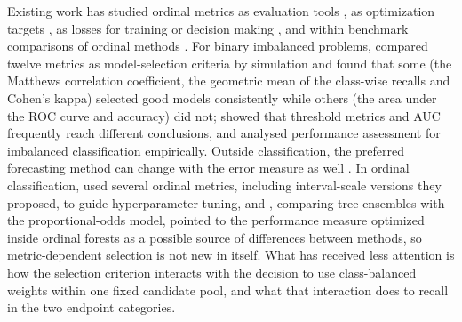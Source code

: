 \documentclass[pdflatex,sn-mathphys-ay]{sn-jnl}
\theoremstyle{thmstyleone}
\theoremstyle{thmstylethree}
\begin{document}
Existing work has studied ordinal metrics as evaluation tools \citep{Baccianella2009,BenDavid2008,Yilmaz2023,Binotto2025}, as optimization targets \citep{CruzRamirez2014}, as losses for training or decision making \citep{delaTorre2018,Delgado2026}, and within benchmark comparisons of ordinal methods \citep{Gutierrez2016,Buczak2025}. For binary imbalanced problems, \citet{delaCruzHuayanay2024} compared twelve metrics as model-selection criteria by simulation and found that some (the Matthews correlation coefficient, the geometric mean of the class-wise recalls and Cohen's kappa) selected good models consistently while others (the area under the ROC curve and accuracy) did not; \citet{Wong2025} showed that threshold metrics and AUC frequently reach different conclusions, and \citet{Gaudreault2024} analysed performance assessment for imbalanced classification empirically. Outside classification, the preferred forecasting method can change with the error measure as well \citep{Stroila2026}. In ordinal classification, \citet{Binotto2025} used several ordinal metrics, including interval-scale versions they proposed, to guide hyperparameter tuning, and \citet{Buczak2025}, comparing tree ensembles with the proportional-odds model, pointed to the performance measure optimized inside ordinal forests as a possible source of differences between methods, so metric-dependent selection is not new in itself. What has received less attention is how the selection criterion interacts with the decision to use class-balanced weights within one fixed candidate pool, and what that interaction does to recall in the two endpoint categories.
\end{document}
